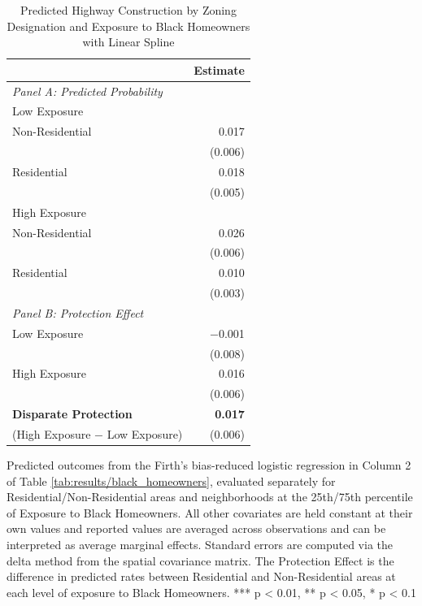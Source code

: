 \begin{table}[h]
\centering
\caption{Predicted Highway Construction by Zoning Designation and Exposure to Black Homeowners with Linear Spline}
\label{tab:predicted_outcomes/black_homeowners_logitinteractions}
\begin{threeparttable}
\begin{tabular}{lr@{\hspace{1.2em}}}
\toprule
 & Estimate \\
\midrule
\textit{Panel A: Predicted Probability} & \\
\addlinespace[2pt]
Low Exposure & \\
\quad Non-Residential & 0.017 \\
 & (0.006) \\[4pt]
\quad Residential & 0.018 \\
 & (0.005) \\[4pt]
High Exposure & \\
\quad Non-Residential & 0.026 \\
 & (0.006) \\[4pt]
\quad Residential & 0.010 \\
 & (0.003) \\[4pt]
\midrule
\textit{Panel B: Protection Effect} & \\
\addlinespace[2pt]
Low Exposure & $-$0.001 \\
 & (0.008) \\[4pt]
High Exposure & 0.016\rlap{$^{***}$} \\
 & (0.006) \\[4pt]
\addlinespace[2pt]
\textbf{Disparate Protection} & \textbf{0.017}\rlap{$^{***}$} \\
(High Exposure $-$ Low Exposure) & (0.006) \\
\bottomrule
\end{tabular}
\begin{tablenotes}[flushleft]
\footnotesize
\item Predicted outcomes from the Firth's bias-reduced logistic regression in Column 2 of Table \ref{tab:results/black_homeowners}, evaluated separately for Residential/Non-Residential areas and neighborhoods at the 25th/75th percentile of Exposure to Black Homeowners. All other covariates are held constant at their own values and reported values are averaged across observations and can be interpreted as average marginal effects. Standard errors are computed via the delta method from the spatial covariance matrix. The Protection Effect is the difference in predicted rates between Residential and Non-Residential areas at each level of exposure to Black Homeowners. *** p < 0.01, ** p < 0.05, * p < 0.1
\end{tablenotes}
\end{threeparttable}
\end{table}
